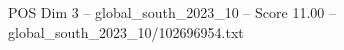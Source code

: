 \begin{textsample}{POS Dim 3 – global\_south\_2023\_10 – Score 11.00 – global\_south\_2023\_10/102696954.txt}
\end{textsample}
